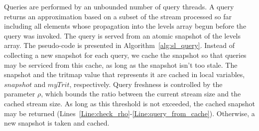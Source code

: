 Queries are performed by an unbounded number of query threads. A query returns an approximation based on a subset of the stream processed so far including all elements whose propagation into the levels array begun before the query was invoked. The query is served from an atomic snapshot of the levels array. The pseudo-code is presented in Algorithm~\ref{alg:sl_query}. Instead of collecting a new snapshot for each query, we cache the snapshot so that queries may be serviced from this cache, as long as the snapshot isn't too stale. The snapshot and the tritmap value that represents it are cached in local variables, $\mathit{snapshot}$ and $\mathit{myTrit}$, respectively. Query freshness is controlled by the parameter $\rho$, which bounds the ratio between the current stream size and the cached stream size. As long as this threshold is not exceeded, the cached snapshot may be returned (Lines~\ref{Line:check_rho}-\ref{Line:query_from_cache}). Otherwise, a new snapshot is taken and cached. 


